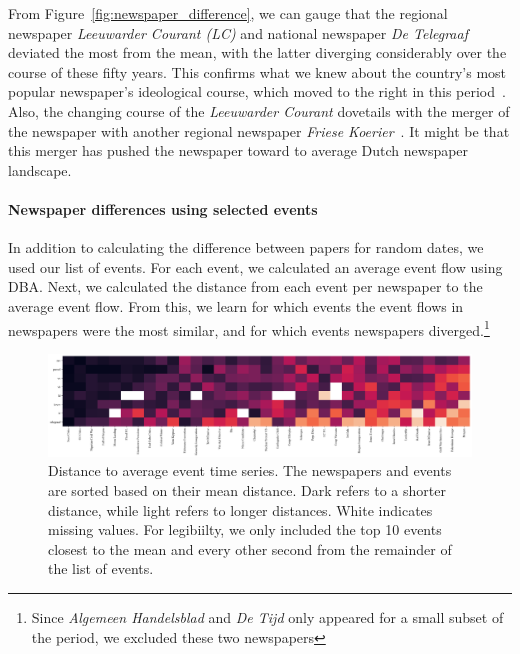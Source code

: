 \documentclass[]{ceurart}
\begin{document}
From Figure~\ref{fig:newspaper_difference}, we can gauge that the regional newspaper \textit{Leeuwarder Courant (LC)} and national newspaper \textit{De Telegraaf} deviated the most from the mean, with the latter diverging considerably over the course of these fifty years. This confirms what we knew about the country's most popular newspaper's ideological course, which moved to the right in this period~\cite{hoevenConcentratieKritischeAutonomie2019}. Also, the changing course of the \textit{Leeuwarder Courant} dovetails with the merger of the newspaper with another regional newspaper \textit{Friese Koerier}~\cite{broersmaNieusteTydingenLeeuwarder2002}. It might be that this merger has pushed the newspaper toward to average Dutch newspaper landscape. 


\paragraph{Newspaper differences using selected events}
In addition to calculating the difference between papers for random dates, we used our list of events. For each event, we calculated an average event flow using DBA. Next, we calculated the distance from each event per newspaper to the average event flow. From this, we learn for which events the event flows in newspapers were the most similar, and for which events newspapers diverged.\footnote{Since \textit{Algemeen Handelsblad} and \textit{De Tijd} only appeared for a small subset of the period, we excluded these two newspapers}

\begin{figure}
    \centering
    \includegraphics[width=\linewidth]{figures/img7.png}
    \caption{Distance to average event time series. The newspapers and events are sorted based on their mean distance. Dark refers to a shorter distance, while light refers to longer distances. White indicates missing values. For legibiilty, we only included the top 10 events closest to the mean and every other second from the remainder of the list of events.}
    \label{fig:newspaper_event_difference}
\end{figure}
\end{document}
